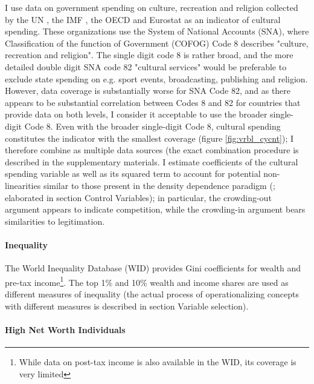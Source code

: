 \documentclass[11pt]{article}
\begin{document}
I use data on government spending on culture, recreation and religion collected by the UN \parencite{UN_2022_consumption}, the IMF \parencite{IMF_2022_GFS}, the OECD \parencite{OECD_2022_SNA_TABLE11_ARCHIVE,OECD_2022_SNA_TABLE11} and Eurostat \parencite{Eurostat_2022_COFOG} as an indicator of cultural spending.
These organizations use the System of National Accounts (SNA), where Classification of the function of Government (COFOG) Code 8 describes "culture, recreation and religion".
The single digit code 8 is rather broad, and the more detailed  double digit SNA code 82 "cultural services" would be preferable to exclude state spending on e.g. sport events, broadcasting, publishing and religion. 
However, data coverage is substantially worse for SNA Code 82, and as there appears to be substantial correlation between Codes 8 and 82 for countries that provide data on both levels, I consider it acceptable to use the broader single-digit Code 8.
Even with the broader single-digit Code 8, cultural spending constitutes the indicator with the smallest coverage (figure \ref{fig:vrbl_cycnt}); I therefore combine as multiple data sources (the exact combination procedure is described in the supplementary materials.
I estimate coefficients of the cultural spending variable as well as its squared term to account for potential non-linearities similar to those present in the density dependence paradigm (\cite{Hannan_1992_dynamics};  elaborated in section Control Variables); in particular, the crowding-out argument appears to indicate competition, while the crowding-in argument bears similarities to legitimation.


\paragraph*{Inequality}

The World Inequality Database (WID) provides Gini coefficients for wealth and pre-tax income\footnote{While data on post-tax income is also available in the WID, its coverage is very limited}.
The top 1\% and 10\% wealth and income shares are used as different measures of inequality (the actual process of operationalizing concepts with different measures is described in section Variable selection).


\paragraph*{High Net Worth Individuals}
\end{document}
